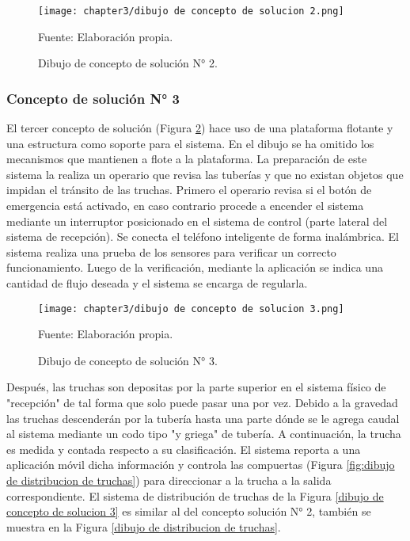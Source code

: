 \begin{figure}[H]
	\centering
	\texttt{[image: chapter3/dibujo de concepto de solucion 2.png]}
	\caption{Dibujo de concepto de solución N° 2.}
	\begin{myflushleftportland}
		Fuente: Elaboración propia.
	\end{myflushleftportland}
	\label{fig:dibujo de concepto de solucion 2}
\end{figure}

\subsubsection{Concepto de solución N° 3}

El tercer concepto de solución (Figura \ref{fig:dibujo de concepto de solucion 3}) hace uso de una plataforma flotante y una estructura como soporte para el sistema. En el dibujo se ha omitido los mecanismos que mantienen a flote a la plataforma. La preparación de este sistema la realiza un operario que revisa las tuberías y que no existan objetos que impidan el tránsito de las truchas. Primero el operario revisa si el botón de emergencia está activado, en caso contrario procede a encender el sistema mediante un interruptor posicionado en el sistema de control (parte lateral del sistema de recepción). Se conecta el teléfono inteligente de forma inalámbrica. El sistema realiza una prueba de los sensores para verificar un correcto funcionamiento. Luego de la verificación, mediante la aplicación se indica una cantidad de flujo deseada y el sistema se encarga de regularla.

\begin{figure}[H]
	\centering
	\texttt{[image: chapter3/dibujo de concepto de solucion 3.png]}
	\caption{Dibujo de concepto de solución N° 3.}
	\begin{myflushleftportland}
		Fuente: Elaboración propia.
	\end{myflushleftportland}
	\label{fig:dibujo de concepto de solucion 3}
\end{figure}

Después, las truchas son depositas por la parte superior en el sistema físico de "recepción" de tal forma que solo puede pasar una por vez. Debido a la gravedad las truchas descenderán por la tubería hasta una parte dónde se le agrega caudal al sistema mediante un codo tipo "y griega" de tubería. A continuación, la trucha es medida y contada respecto a su clasificación. El sistema reporta a una aplicación móvil dicha información y controla las compuertas (Figura \ref{fig:dibujo de distribucion de truchas}) para direccionar a la trucha a la salida correspondiente. El sistema de distribución de truchas  de la Figura \ref{dibujo de concepto de solucion 3} es similar al del concepto solución N° 2, también se muestra en la Figura \ref{dibujo de distribucion de truchas}.

